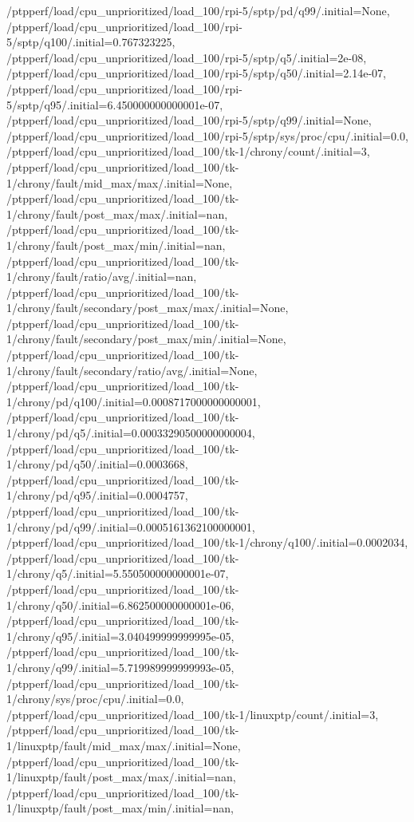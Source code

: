 {    /ptpperf/load/cpu_unprioritized/load_100/rpi-5/sptp/pd/q99/.initial=None,
    /ptpperf/load/cpu_unprioritized/load_100/rpi-5/sptp/q100/.initial=0.767323225,
    /ptpperf/load/cpu_unprioritized/load_100/rpi-5/sptp/q5/.initial=2e-08,
    /ptpperf/load/cpu_unprioritized/load_100/rpi-5/sptp/q50/.initial=2.14e-07,
    /ptpperf/load/cpu_unprioritized/load_100/rpi-5/sptp/q95/.initial=6.450000000000001e-07,
    /ptpperf/load/cpu_unprioritized/load_100/rpi-5/sptp/q99/.initial=None,
    /ptpperf/load/cpu_unprioritized/load_100/rpi-5/sptp/sys/proc/cpu/.initial=0.0,
    /ptpperf/load/cpu_unprioritized/load_100/tk-1/chrony/count/.initial=3,
    /ptpperf/load/cpu_unprioritized/load_100/tk-1/chrony/fault/mid_max/max/.initial=None,
    /ptpperf/load/cpu_unprioritized/load_100/tk-1/chrony/fault/post_max/max/.initial=nan,
    /ptpperf/load/cpu_unprioritized/load_100/tk-1/chrony/fault/post_max/min/.initial=nan,
    /ptpperf/load/cpu_unprioritized/load_100/tk-1/chrony/fault/ratio/avg/.initial=nan,
    /ptpperf/load/cpu_unprioritized/load_100/tk-1/chrony/fault/secondary/post_max/max/.initial=None,
    /ptpperf/load/cpu_unprioritized/load_100/tk-1/chrony/fault/secondary/post_max/min/.initial=None,
    /ptpperf/load/cpu_unprioritized/load_100/tk-1/chrony/fault/secondary/ratio/avg/.initial=None,
    /ptpperf/load/cpu_unprioritized/load_100/tk-1/chrony/pd/q100/.initial=0.0008717000000000001,
    /ptpperf/load/cpu_unprioritized/load_100/tk-1/chrony/pd/q5/.initial=0.00033290500000000004,
    /ptpperf/load/cpu_unprioritized/load_100/tk-1/chrony/pd/q50/.initial=0.0003668,
    /ptpperf/load/cpu_unprioritized/load_100/tk-1/chrony/pd/q95/.initial=0.0004757,
    /ptpperf/load/cpu_unprioritized/load_100/tk-1/chrony/pd/q99/.initial=0.0005161362100000001,
    /ptpperf/load/cpu_unprioritized/load_100/tk-1/chrony/q100/.initial=0.0002034,
    /ptpperf/load/cpu_unprioritized/load_100/tk-1/chrony/q5/.initial=5.550500000000001e-07,
    /ptpperf/load/cpu_unprioritized/load_100/tk-1/chrony/q50/.initial=6.862500000000001e-06,
    /ptpperf/load/cpu_unprioritized/load_100/tk-1/chrony/q95/.initial=3.040499999999995e-05,
    /ptpperf/load/cpu_unprioritized/load_100/tk-1/chrony/q99/.initial=5.719989999999993e-05,
    /ptpperf/load/cpu_unprioritized/load_100/tk-1/chrony/sys/proc/cpu/.initial=0.0,
    /ptpperf/load/cpu_unprioritized/load_100/tk-1/linuxptp/count/.initial=3,
    /ptpperf/load/cpu_unprioritized/load_100/tk-1/linuxptp/fault/mid_max/max/.initial=None,
    /ptpperf/load/cpu_unprioritized/load_100/tk-1/linuxptp/fault/post_max/max/.initial=nan,
    /ptpperf/load/cpu_unprioritized/load_100/tk-1/linuxptp/fault/post_max/min/.initial=nan,
}
